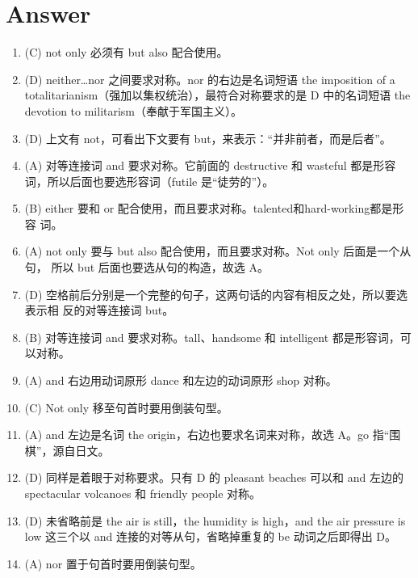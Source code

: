\section{Answer}
\begin{enumerate}
\item (C) not only 必须有 but also 配合使用。

\item (D) neither…nor 之间要求对称。nor 的右边是名词短语 the imposition of a totalitarianism（强加以集权统治），最符合对称要求的是 D 中的名词短语 the devotion to militarism（奉献于军国主义）。

\item (D) 上文有 not，可看出下文要有 but，来表示：“并非前者，而是后者”。

\item (A) 对等连接词 and 要求对称。它前面的 destructive 和 wasteful 都是形容词，所以后面也要选形容词（futile 是“徒劳的”）。

\item (B) either 要和 or 配合使用，而且要求对称。talented和hard-working都是形容
  词。

\item (A) not only 要与 but also 配合使用，而且要求对称。Not only 后面是一个从句，
  所以 but 后面也要选从句的构造，故选 A。

\item (D) 空格前后分别是一个完整的句子，这两句话的内容有相反之处，所以要选表示相
  反的对等连接词 but。

\item (B) 对等连接词 and 要求对称。tall、handsome 和 intelligent 都是形容词，可以对称。


\item (A) and 右边用动词原形 dance 和左边的动词原形 shop 对称。

\item (C) Not only 移至句首时要用倒装句型。
\item  (A) and 左边是名词 the origin，右边也要求名词来对称，故选 A。go 指“围棋”，源自日文。

\item (D) 同样是着眼于对称要求。只有 D 的 pleasant beaches 可以和 and 左边的 spectacular volcanoes 和 friendly people 对称。

\item (D) 未省略前是 the air is still，the humidity is high，and the air pressure is low 这三个以 and 连接的对等从句，省略掉重复的 be 动词之后即得出 D。

\item(A) nor 置于句首时要用倒装句型。


\end{enumerate}
